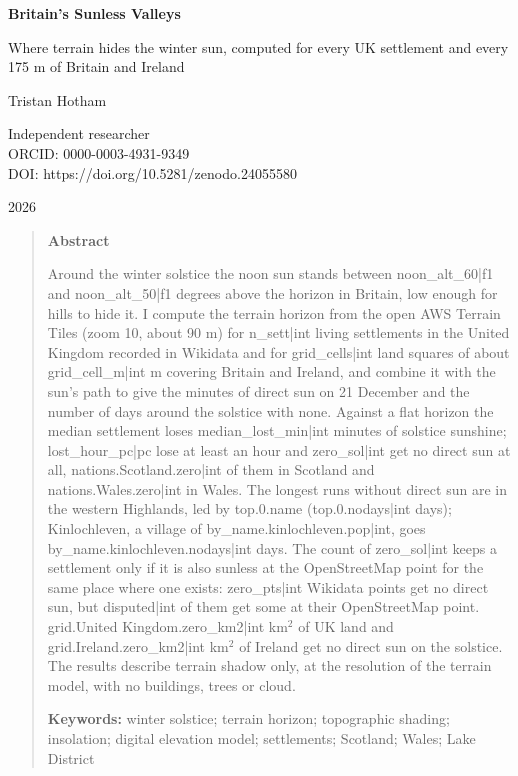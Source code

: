 \documentclass[11pt,a4paper]{article}
\begin{document}
\begin{center}
{\Large\bfseries Britain's Sunless Valleys\par}
\vspace{0.4em}
{\large Where terrain hides the winter sun, computed for every UK settlement and every 175 m of Britain and Ireland\par}
\vspace{1.2em}
{\large Tristan Hotham\par}
\vspace{0.3em}
{\small Independent researcher\\
ORCID: 0000-0003-4931-9349\\
DOI: https://doi.org/10.5281/zenodo.24055580\par}
\vspace{0.8em}
2026
\end{center}

\begin{quote}
\small
\begin{center}\textbf{Abstract}\end{center}
Around the winter solstice the noon sun stands between {{noon_alt_60|f1}} and {{noon_alt_50|f1}} degrees above the horizon in Britain, low enough for hills to hide it. I compute the terrain horizon from the open AWS Terrain Tiles (zoom 10, about 90 m) for {{n_sett|int}} living settlements in the United Kingdom recorded in Wikidata and for {{grid_cells|int}} land squares of about {{grid_cell_m|int}} m covering Britain and Ireland, and combine it with the sun's path to give the minutes of direct sun on 21 December and the number of days around the solstice with none. Against a flat horizon the median settlement loses {{median_lost_min|int}} minutes of solstice sunshine; {{lost_hour_pc|pc}} lose at least an hour and {{zero_sol|int}} get no direct sun at all, {{nations.Scotland.zero|int}} of them in Scotland and {{nations.Wales.zero|int}} in Wales. The longest runs without direct sun are in the western Highlands, led by {{top.0.name}} ({{top.0.nodays|int}} days); Kinlochleven, a village of {{by_name.kinlochleven.pop|int}}, goes {{by_name.kinlochleven.nodays|int}} days. The count of {{zero_sol|int}} keeps a settlement only if it is also sunless at the OpenStreetMap point for the same place where one exists: {{zero_pts|int}} Wikidata points get no direct sun, but {{disputed|int}} of them get some at their OpenStreetMap point. {{grid.United Kingdom.zero_km2|int}} km$^2$ of UK land and {{grid.Ireland.zero_km2|int}} km$^2$ of Ireland get no direct sun on the solstice. The results describe terrain shadow only, at the resolution of the terrain model, with no buildings, trees or cloud.

\textbf{Keywords:} winter solstice; terrain horizon; topographic shading; insolation; digital elevation model; settlements; Scotland; Wales; Lake District
\end{quote}
\end{document}
